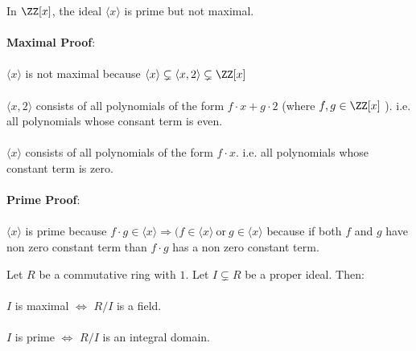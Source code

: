 \documentclass[class=scrartcl, crop=false]{standalone}
\begin{document}
\begin{example}
  In $\ZZ[x]$, the ideal $\langle x \rangle $ is prime but not maximal.
  \\\\
  \textbf{Maximal Proof}:
  \\\\
  $\langle x \rangle $ is not maximal because $\langle x \rangle \subsetneq \langle x, 2 \rangle \subsetneq \ZZ[x]$
  \\\\
  $\langle x, 2 \rangle $ consists of all polynomials of the form $f \cdot x + g \cdot 2$ (where $f, g \in \ZZ[x]$ ).  i.e. all polynomials whose consant term is even.
  \\\\
  $\langle x \rangle $ consists of all polynomials of the form $f \cdot x$. i.e. all polynomials whose constant term is zero.
  \\\\
  \textbf{Prime Proof}:
  \\\\
  $\langle x \rangle $ is prime because $f \cdot g \in \langle x \rangle \Rightarrow (f \in \langle x \rangle \ \text{or} \ g \in \langle x \rangle $ because if both $f$ and $g$ have non zero constant term than $f \cdot g$ has a non zero constant term.
\end{example} 

\begin{theorem}
  Let $R$ be a commutative ring with $1$. Let $I \subsetneq R$ be a proper ideal. Then:
  \\\\
  $I$ is maximal $\Leftrightarrow$ $R / I$ is a field.
  \\\\
  $I$ is prime $\Leftrightarrow$ $R / I$ is an integral domain.
\end{theorem} 
\end{document}

